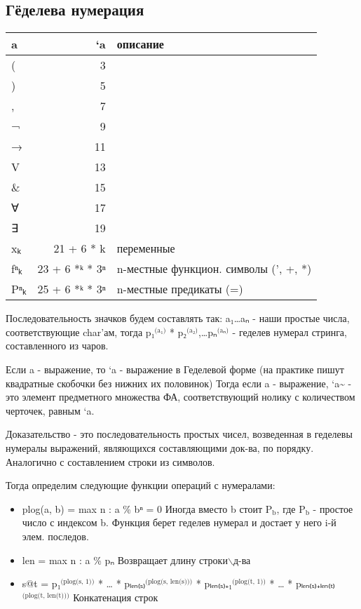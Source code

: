 \documentclass[11pt]{article}
\begin{document}
\subsection{Гёделева нумерация}
\label{sec-12-2}
\begin{center}
\begin{tabular}{lrl}
a & `a & описание\\
\hline
( & 3 & \\
) & 5 & \\
, & 7 & \\
¬ & 9 & \\
→ & 11 & \\
V & 13 & \\
\& & 15 & \\
∀ & 17 & \\
∃ & 19 & \\
xₖ & 21 + 6 * k & переменные\\
fⁿₖ & 23 + 6 *ᵏ * 3ⁿ & n-местные функцион. символы (', +, *)\\
Pⁿₖ & 25 + 6 *ᵏ * 3ⁿ & n-местные предикаты (=)\\
\hline
\end{tabular}
\end{center}

Последовательность значков будем составлять так:
a₁\ldots{}aₙ - наши простые числа, соответствующие char'ам, тогда
p₁$^{\text{(a₁)}}$ * p₂$^{\text{(a₂)}}$,\ldots{}pₙ$^{\text{(aₙ)}}$ - геделев нумерал стринга, составленного
из чаров.

Если a - выражение, то `a - выражение в Геделевой форме (на
практике пишут квадратные скобочки без нижних их половинок)
Тогда если a - выражение, `a\textasciitilde{} - это элемент предметного множества
ФА, соответствующий нолику с количеством черточек, равным `a.

Доказательство - это последовательность простых чисел, возведенная
в геделевы нумералы выражений, являющихся составляющими док-ва, по
порядку. Аналогично с составлением строки из символов.

Тогда определим следующие функции операций с нумералами:
\begin{itemize}
\item plog(a, b) = max n : a \% bⁿ = 0
Иногда вместо b стоит P$_{\text{b}}$, где P$_{\text{b}}$ - простое число с индексом b.
Функция берет геделев нумерал и достает у него i-й элем. последов.
\item len = max n : a \% pₙ
Возвращает длину строки$\backslash$д-ва
\item s@t = p₁$^{\text{(plog(s, 1))}}$ * \ldots{} * pₗₑₙ₍ₛ₎$^{\text{(plog(s, len(s)))}}$ *
pₗₑₙ₍ₛ₎₊₁$^{\text{(plog(t, 1))}}$ * \ldots{} * pₗₑₙ₍ₛ₎₊ₗₑₙ₍ₜ₎$^{\text{(plog(t, len(t)))}}$
Конкатенация строк
\end{itemize}
\end{document}
